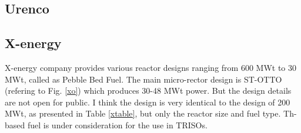 \documentclass[10pt,a4paper]{article}
\begin{document}
\subsection{Urenco}

\subsection{X-energy}
X-energy company provides various reactor designs ranging from 600 MWt to 30 MWt, called as Pebble Bed Fuel. The main micro-rector design is ST-OTTO (refering to Fig.  \ref{xo}) which produces 30-48 MWt power. But the design details are not open for public. I think the design is very identical to the design of 200 MWt, as presented in Table \ref{xtable}, but only the reactor size and fuel type. Th-based fuel is under consideration for the use in TRISOs. 
\end{document}
